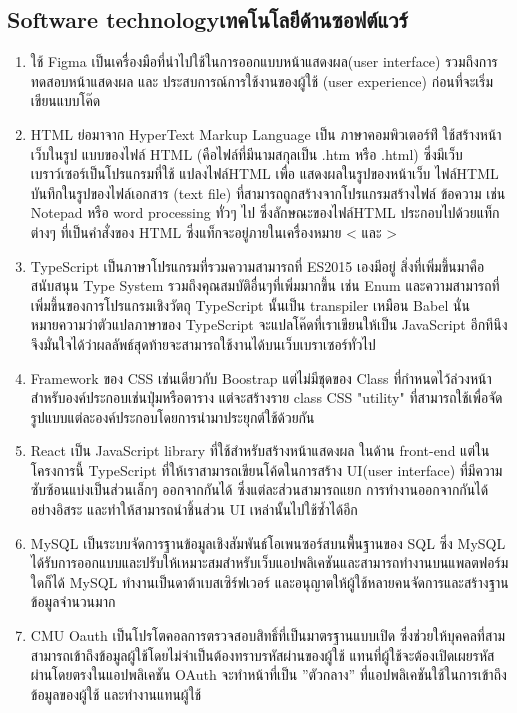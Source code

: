 \subsection{\ifenglish Software technology\else เทคโนโลยีด้านซอฟต์แวร์\fi}
\begin{enumerate}
    \item ใช้ Figma\cite{Figma} เป็นเครื่องมือที่นำไปใช้ในการออกแบบหน้าแสดงผล(user interface) รวมถึงการทดสอบหน้าแสดงผล และ ประสบการณ์การใช้งานของผู้ใช้ (user experience) ก่อนที่จะเริ่มเขียนแบบโค๊ด
    \item HTML\cite{HTML} ย่อมาจาก HyperText Markup Language เป็น ภาษาคอมพิวเตอร์ท่ี ใช้สร้างหน้าเว็บในรูป แบบของไฟล์ HTML (คือไฟล์ที่มีนามสกุลเป็น .htm หรือ .html) ซึ่งมีเว็บเบราว์เซอร์เป็นโปรแกรมที่ใช้ แปลงไฟล์HTML เพื่อ แสดงผลในรูปของหน้าเว็บ ไฟล์HTML บันทึกในรูปของไฟล์เอกสาร (text file) ที่สามารถถูกสร้างจากโปรแกรมสร้างไฟล์ ข้อความ เช่น Notepad หรือ word processing ทั่วๆ ไป ซึ่งลักษณะของไฟล์HTML ประกอบไปด้วยแท็กต่างๆ ที่เป็นคําสั่งของ HTML ซึ่งแท็กจะอยู่ภายในเครื่องหมาย < และ >
    \item TypeScript\cite{TypeScript} เป็นภาษาโปรแกรมที่รวมความสามารถที่ ES2015 เองมีอยู่ สิ่งที่เพิ่มขึ้นมาคือสนับสนุน Type System รวมถึงคุณสมบัติอื่นๆที่เพิ่มมากขึ้น เช่น Enum และความสามารถที่เพิ่มขึ้นของการโปรแกรมเชิงวัตถุ TypeScript นั้นเป็น transpiler เหมือน Babel นั่นหมายความว่าตัวแปลภาษาของ TypeScript จะแปลโค๊ดที่เราเขียนให้เป็น JavaScript อีกทีนึง จึงมั่นใจได้ว่าผลลัพธ์สุดท้ายจะสามารถใช้งานได้บนเว็บเบราเซอร์ทั่วไป  \item Framework ของ CSS เช่นเดียวกับ Boostrap แต่ไม่มีชุดของ Class ที่กำหนดไว้ล่วงหน้าสำหรับองค์ประกอบเช่นปุ่มหรือตาราง แต่จะสร้างราย class CSS "utility" ที่สามารถใช้เพื่อจัดรูปแบบแต่ละองค์ประกอบโดยการนำมาประยุกต์ใช้ด้วยกัน
    \item React\cite{ReactJS} เป็น JavaScript library ที่ใช้สําหรับสร้างหน้าแสดงผล ในด้าน front-end แต่ในโครงการนี้ TypeScript ที่ให้เราสามารถเขียนโค้ดในการสร้าง UI(user interface) ที่มีความซับซ้อนแบ่งเป็นส่วนเล็กๆ ออกจากกันได้ ซึ่งแต่ละส่วนสามารถแยก การทํางานออกจากกันได้อย่างอิสระ และทําให้สามารถนําชิ้นส่วน UI เหล่านั้นไปใช้ซํ้าได้อีก
    \item MySQL \cite{MySQL} เป็นระบบจัดการฐานข้อมูลเชิงสัมพันธ์โอเพนซอร์สบนพื้นฐานของ SQL ซึ่ง MySQL ได้รับการออกแบบและปรับให้เหมาะสมสำหรับเว็บแอปพลิเคชันและสามารถทำงานบนแพลตฟอร์มใดก็ได้ MySQL ทำงานเป็นดาต้าเบสเซิร์ฟเวอร์ และอนุญาตให้ผู้ใช้หลายคนจัดการและสร้างฐานข้อมูลจำนวนมาก
    \item CMU Oauth\cite{Oauth} เป็นโปรโตคอลการตรวจสอบสิทธิ์ที่เป็นมาตรฐานแบบเปิด ซึ่งช่วยให้บุคคลที่สามสามารถเข้าถึงข้อมูลผู้ใช้โดยไม่จําเป็นต้องทราบรหัสผ่านของผู้ใช้ แทนที่ผู้ใช้จะต้องเปิดเผยรหัสผ่านโดยตรงในแอปพลิเคชัน OAuth จะทําหน้าที่เป็น ”ตัวกลาง” ที่แอปพลิเคชันใช้ในการเข้าถึงข้อมูลของผู้ใช้ และทํางานแทนผู้ใช้


\end{enumerate}






